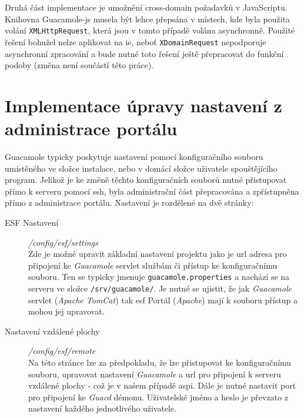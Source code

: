 Druhá část implementace je umožnění cross-domain požadavků v JavaScriptu. Knihovna Guacamole-js musela být lehce přepsána v místech, kde byla použita volání \texttt{XMLHttpRequest}, která jsou v tomto případě volána asynchronně. Použité řešení bohužel nelze aplikovat na \gls{ie}, neboť \texttt{XDomainRequest} nepodporuje asynchronní zpracování a bude nutné toto řešení ještě přepracovat do funkční podoby (změna není součástí této práce).

\section{Implementace úpravy nastavení z administrace portálu}
Guacamole typicky poskytuje nastavení pomocí konfiguračního souboru umístěného ve složce instalace, nebo v domácí složce uživatele spouštějícího program. Jelikož je ke změně těchto konfiguračních souborů nutné přistupovat přímo k serveru pomocí \gls{ssh}, byla administrační část přepracována a zpřístupněna přímo z administrace portálu. Nastavení je rozdělené na dvě stránky: 

\begin{description}
  \item[ESF Nastavení] \hfill \emph{/config/esf/settings} \\
     Zde je možné upravit základní nastavení projektu jako je \gls{url} adresa pro připojení ke \emph{Guacamole} \gls{servlet} službám či přístup ke konfiguračnímu souboru. Ten se typicky jmenuje \texttt{guacamole.properties} a nachází se na serveru ve složce \texttt{/srv/guacamole/}. Je nutné se ujistit, že jak \emph{Guacamole} \gls{servlet} (\emph{Apache TomCat}) tak \gls{esf} Portál (\emph{Apache}) mají k souboru přístup a mohou jej upravovat.
  \item[Nastavení vzdálené plochy] \hfill \emph{/config/esf/remote} \\
Na této stránce lze za předpokladu, že lze přistupovat ke konfiguračnímu souboru, upravovat nastavení \emph{Guacamole} a \gls{url} pro připojení k serveru vzdálené plochy - což je v našem případě \gls{aspi}. Dále je nutné nastavit port pro připojení ke \emph{Guacd} démonu. Uživatelské jméno a heslo je převzato z nastavení každého jednotlivého uživatele.
\end{description}
